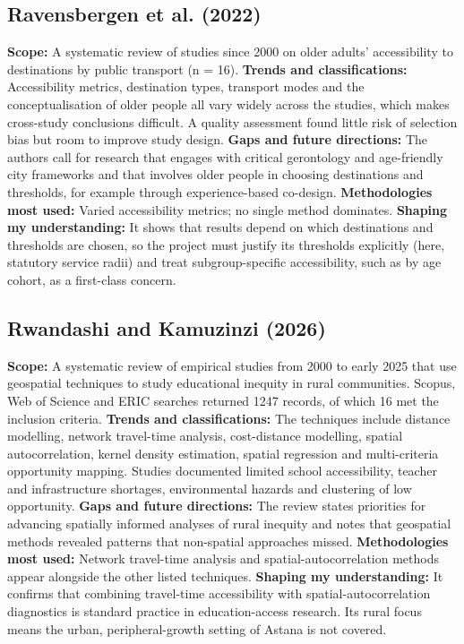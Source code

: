\documentclass[pdflatex,sn-mathphys-num]{sn-jnl}
\begin{document}
\subsection{Ravensbergen et al. (2022) \cite{ravensbergen2022}}
\textbf{Scope:} A systematic review of studies since 2000 on older adults' accessibility to destinations by public transport (n = 16).
\textbf{Trends and classifications:} Accessibility metrics, destination types, transport modes and the conceptualisation of older people all vary widely across the studies, which makes cross-study conclusions difficult. A quality assessment found little risk of selection bias but room to improve study design.
\textbf{Gaps and future directions:} The authors call for research that engages with critical gerontology and age-friendly city frameworks and that involves older people in choosing destinations and thresholds, for example through experience-based co-design.
\textbf{Methodologies most used:} Varied accessibility metrics; no single method dominates.
\textbf{Shaping my understanding:} It shows that results depend on which destinations and thresholds are chosen, so the project must justify its thresholds explicitly (here, statutory service radii) and treat subgroup-specific accessibility, such as by age cohort, as a first-class concern.

\subsection{Rwandashi and Kamuzinzi (2026) \cite{rwandashi2026}}
\textbf{Scope:} A systematic review of empirical studies from 2000 to early 2025 that use geospatial techniques to study educational inequity in rural communities. Scopus, Web of Science and ERIC searches returned 1247 records, of which 16 met the inclusion criteria.
\textbf{Trends and classifications:} The techniques include distance modelling, network travel-time analysis, cost-distance modelling, spatial autocorrelation, kernel density estimation, spatial regression and multi-criteria opportunity mapping. Studies documented limited school accessibility, teacher and infrastructure shortages, environmental hazards and clustering of low opportunity.
\textbf{Gaps and future directions:} The review states priorities for advancing spatially informed analyses of rural inequity and notes that geospatial methods revealed patterns that non-spatial approaches missed.
\textbf{Methodologies most used:} Network travel-time analysis and spatial-autocorrelation methods appear alongside the other listed techniques.
\textbf{Shaping my understanding:} It confirms that combining travel-time accessibility with spatial-autocorrelation diagnostics is standard practice in education-access research. Its rural focus means the urban, peripheral-growth setting of Astana is not covered.
\end{document}
